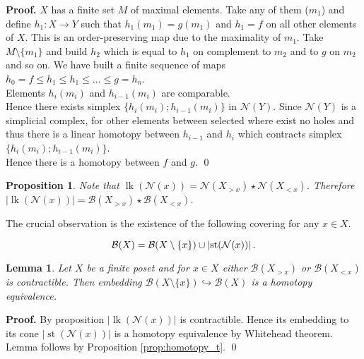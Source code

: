\documentclass[english,12pt]{article}
\newcounter{stmcounter}[section]
\numberwithin{equation}{section}
\newtheorem{proposition}[stmcounter]{Proposition}
\newtheorem{lemma}[stmcounter]{Lemma}
\theoremstyle{definition}
\theoremstyle{remark}
\newenvironment{pf}{\noindent\textbf{Proof.}}{\qed}
\renewcommand{\leq}{\leqslant}
\begin{document}
\begin{pf}
  $X$ has a finite set $M$ of maximal elements. Take any of them ($m_1$) and define $h_1 : X \to Y$ such that $h_1(m_1) = g(m_1)$ and $h_1 = f$ on all other elements of $X$. This is an order-preserving map due to the maximality of $m_1$. Take $M \setminus \{m_1\}$ and build $h_2$ which is equal to $h_1$ on complement to $m_2$ and to $g$ on $m_2$ and so on. We have built a finite sequence of maps $h_0 = f \leq h_1 \leq h_1 \leq \ldots \leq g = h_n$.\\

  Elements $h_i(m_i)$ and $h_{i-1}(m_i)$ are comparable.\\
  Hence there exists simplex $\{h_i(m_i); h_{i-1}(m_i)\}$ in $\mathcal{N}(Y)$. Since $\mathcal{N}(Y)$ is a simplicial complex, for other elements between selected where exist no holes and thus there is a linear homotopy between $h_{i-1}$ and $h_{i}$ which contracts simplex $\{h_i(m_i); h_{i-1}(m_i)\}$.\\

  Hence there is a homotopy between $f$ and $g$.
\end{pf}

\begin{proposition}
  Note that $\operatorname{lk}(\mathcal{N}(x)) = \mathcal{N}(X_{>x}) \star \mathcal{N}(X_{<x})$. Therefore $\left|\operatorname{lk}(\mathcal{N}(x))\right| = \mathcal{B}(X_{>x}) \star \mathcal{B}(X_{<x})$.
\end{proposition}

The crucial observation is the existence of the following covering for any $x \in X$.

\begin{equation}\label{covering}
  \mathcal{B}(X) = \mathcal{B}(X \setminus \{x\}) \cup \left|\operatorname{st}(\mathcal{N}(x))\right|.\\
\end{equation}

\begin{lemma}
  \label{lem:homotopy}
  Let $X$ be a finite poset and for $x \in X$ either $\mathcal{B}(X_{>x})$ or $\mathcal{B}(X_{<x})$ is contractible. Then embedding $\mathcal{B}(X \setminus \{x\}) \hookrightarrow \mathcal{B}(X)$ is a homotopy equivalence.
\end{lemma}

\begin{pf}
  By proposition $\left|\operatorname{lk}(\mathcal{N}(x))\right|$ is contractible. Hence its embedding to its cone $\left|\operatorname{st}(\mathcal{N}(x))\right|$ is a homotopy equivalence by Whitehead theorem. Lemma follows by Proposition \ref{prop:homotopy_t}.
\end{pf}
\end{document}
